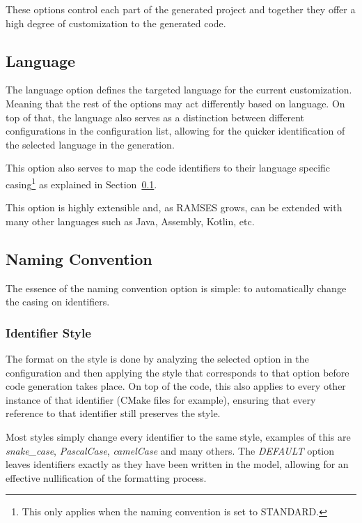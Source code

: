 These options control each part of the generated project and together they offer a high degree of customization to the generated code. 

\subsection{Language}
\label{sec:dsl_lang}

The language option defines the targeted language for the current customization. Meaning that the rest of the options may act differently based on language. On top of that, the language also serves as a distinction between different configurations in the configuration list, allowing for the quicker identification of the selected language in the generation.

This option also serves to map the code \glspl{identifier} to their language specific casing\footnote{This only applies when the naming convention is set to STANDARD.} as explained in Section~\ref{sec:dsl_lang}.

This option is highly extensible and, as \gls{RAMSES} grows, can be extended with many other languages such as Java, Assembly, Kotlin, etc.

\subsection{Naming Convention}
\label{sec:dsl_name}

The essence of the naming convention option is simple: to automatically change the casing on \glspl{identifier}.

\subsubsection{Identifier Style}
\label{sec:dsl_name_style}

The format on the style is done by analyzing the selected option in the configuration and then applying the style that corresponds to that option before code generation takes place. On top of the code, this also applies to every other instance of that identifier (CMake files for example), ensuring that every reference to that \gls{identifier} still preserves the style.

Most styles simply change every \gls{identifier} to the same style, examples of this are \textit{snake\_case}, \textit{PascalCase}, \textit{camelCase} and many others. The \textit{DEFAULT} option leaves identifiers exactly as they have been written in the model, allowing for an effective nullification of the formatting process.

